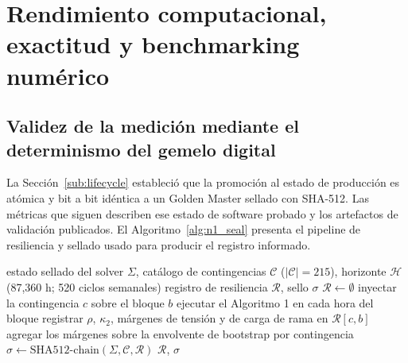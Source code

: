 \section{Rendimiento computacional, exactitud y benchmarking numérico}
\label{sec:benchmarking}

\subsection{Validez de la medición mediante el determinismo del gemelo digital}
\label{sub:determinism}

La Sección~\ref{sub:lifecycle} estableció que la promoción al estado de producción es atómica y bit a bit idéntica a un Golden Master sellado con SHA-512. Las métricas que siguen describen ese estado de software probado y los artefactos de validación publicados. El Algoritmo~\ref{alg:n1_seal} presenta el pipeline de resiliencia y sellado usado para producir el registro informado.

\begin{algorithm}[!t]
\caption{Barrido de resiliencia $N$--$1$ con bootstrap de bloques de 24 horas y sellado SHA-512}
\label{alg:n1_seal}
\begin{algorithmic}[1]
\Require estado sellado del solver $\Sigma$, catálogo de contingencias $\mathcal{C}$
         ($|\mathcal{C}| = 215$), horizonte $\mathcal{H}$ (87,360 h; 520 ciclos semanales)
\Ensure registro de resiliencia $\mathcal{R}$, sello $\sigma$
\State $\mathcal{R} \gets \emptyset$
 
    
      \State inyectar la contingencia $c$ sobre el bloque $b$
      \State ejecutar el Algoritmo 1 en cada hora del bloque
      \State registrar $\rho$, $\kappa_2$, márgenes de tensión y de carga de rama en $\mathcal{R}[c, b]$
   \EndFor
\EndFor
\State agregar los márgenes sobre la envolvente de bootstrap por contingencia
\State $\sigma \gets \mathrm{SHA512}\text{-chain}(\Sigma, \mathcal{C}, \mathcal{R})$ 
\State \Return $\mathcal{R}$, $\sigma$
\end{algorithmic}
\end{algorithm}

